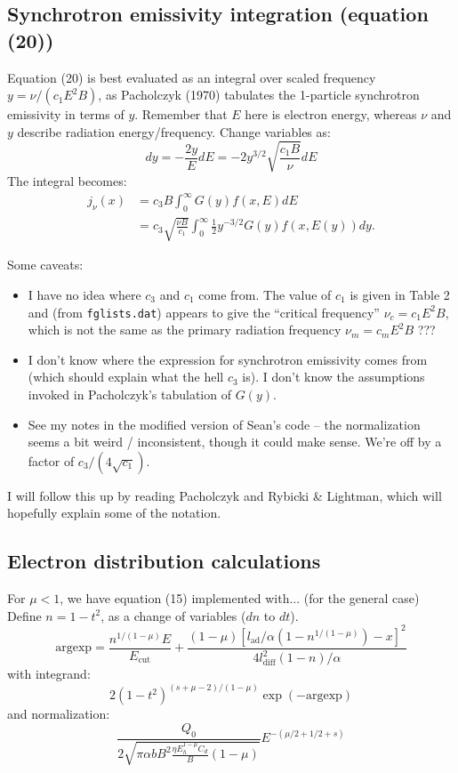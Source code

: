 \documentclass[10pt]{article}
\newcommand{\mt}{\mathrm}
\begin{document}
\subsection*{Synchrotron emissivity integration (equation (20))}

Equation (20) is best evaluated as an integral over scaled frequency
$y = \nu / (c_1 E^2 B)$, as Pacholczyk (1970) tabulates the 1-particle
synchrotron emissivity in terms of $y$.  Remember that $E$ here is electron
energy, whereas $\nu$ and $y$ describe radiation energy/frequency.
Change variables as:
\[
    dy = -\frac{2y}{E} dE = -2 y^{3/2} \sqrt{\frac{c_1 B}{\nu}} dE
\]
The integral becomes:
\begin{align*}
    j_\nu(x) &= c_3 B \int_0^\infty G(y) f(x,E) dE \\
             &= c_3 \sqrt{\frac{\nu B}{c_1}}
                \int_0^\infty \frac{1}{2} y^{-3/2} G(y) f(x,E(y)) dy\text{.}
\end{align*}

Some caveats:
\begin{itemize}
    \item I have no idea where $c_3$ and $c_1$ come from.  The value of $c_1$
        is given in Table 2 and (from {\tt fglists.dat}) appears to give the
        ``critical frequency'' $\nu_c = c_1 E^2 B$, which is not the same as
        the primary radiation frequency $\nu_m = c_m E^2 B$ ???
    \item I don't know where the expression for synchrotron emissivity comes
        from (which should explain what the hell $c_3$ is).  I don't know the
        assumptions invoked in Pacholczyk's tabulation of $G(y)$.
    \item See my notes in the modified version of Sean's code -- the
        normalization seems a bit weird / inconsistent, though it could make
        sense.  We're off by a factor of $c_3 / (4 \sqrt{c_1})$.
\end{itemize}

I will follow this up by reading Pacholczyk and Rybicki \& Lightman, which will
hopefully explain some of the notation.


\subsection*{Electron distribution calculations}

For $\mu < 1$, we have equation (15) implemented with... (for the general case)
Define $n = 1 - t^2$, as a change of variables ($dn$ to $dt$).
\[
    \text{argexp} = \frac{n^{1/(1-\mu)} E}{E_{\mt{cut}}}
    + \frac{(1 - \mu)
        \left[ l_{\mt{ad}}/\alpha \left(1 - n^{1/(1-\mu)}\right) - x \right]^2}
        {4 l_{\mt{diff}}^2 (1-n) / \alpha}
\]
with integrand:
\[
    2 (1 - t^2)^{ (s+\mu-2) / (1-\mu) } \exp(-\text{argexp})
\]
and normalization:
\[
    \frac{Q_0}
    {2 \sqrt{ \pi \alpha b B^2 \frac{\eta E_h^{1-\mu} C_d}{B} (1-\mu) }}
    E^{ -(\mu/2 + 1/2 + s)}
\]
\end{document}
